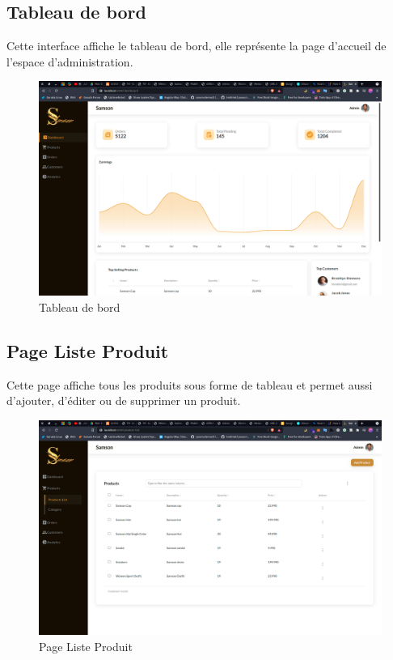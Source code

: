 \documentclass[a4paper, 12pt]{report}
\begin{document}
\subsection{Tableau de bord}
Cette interface affiche le tableau de bord, elle représente la page d'accueil de l'espace d'administration.
\begin{figure}[H]
    \centering
    \includegraphics[width = 1\linewidth]{img/dashboard.png}
    \caption{Tableau de bord}
\end{figure} 
 
\subsection{Page Liste Produit}
Cette page affiche tous les produits sous forme de tableau et permet aussi d'ajouter, d'éditer ou de supprimer un produit.
\begin{figure}[H]
    \centering
    \includegraphics[width = 1\linewidth]{img/product.png}
    \caption{Page Liste Produit}
\end{figure}
\end{document}
